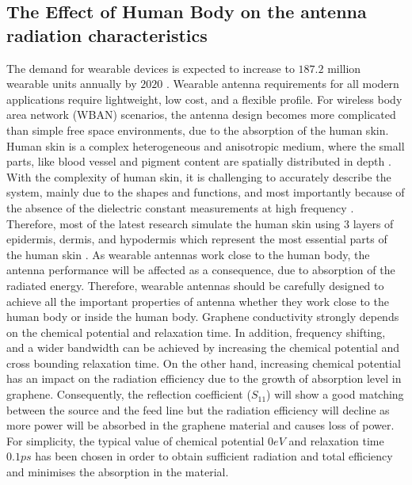 \documentclass[12pt]{suhbook}
\begin{document}
\subsection{The Effect of Human Body on the antenna radiation characteristics}
The demand for wearable devices is expected to increase to $187.2$ million wearable units annually by $2020$ \cite{hernandez2019wearable}. Wearable antenna requirements for all modern applications require lightweight, low cost, and a flexible profile. For wireless body area network (WBAN) scenarios, the antenna design becomes more complicated than simple free space environments, due to the absorption of the human skin. Human skin is a complex heterogeneous and anisotropic medium, where the small parts, like blood vessel and pigment content are spatially distributed in depth \cite{flynn2011modeling}. With the complexity of human skin, it is challenging to accurately describe the system, mainly due to the shapes and functions, and most importantly because of the absence of the dielectric constant measurements at high frequency \cite{alekseev2007human}. Therefore, most of the latest research simulate the human skin using $3$ layers of epidermis, dermis, and hypodermis which represent the most essential parts of the human skin \cite{lynch1989growth}. As wearable antennas work close to the human body, the antenna performance will be affected as a consequence, due to absorption of the radiated energy. Therefore, wearable antennas should be carefully designed to achieve all the important properties of antenna whether they work close to the human body or inside the human body. Graphene conductivity strongly depends on the chemical potential and relaxation time. In addition, frequency shifting, and a wider bandwidth can be achieved by increasing the chemical potential and cross bounding relaxation time. On the other hand, increasing chemical potential has an impact on the radiation efficiency due to the growth of absorption level in graphene. Consequently, the reflection coefficient ($S_{11}$) will show a good matching between the source and the feed line but the radiation efficiency will decline as more power will be absorbed in the graphene material and causes loss of power. For simplicity, the typical value of chemical potential $0 eV$ and relaxation time $0.1 ps$ has been chosen in order to obtain sufficient radiation and total efficiency and minimises the absorption in the material.
\end{document}
